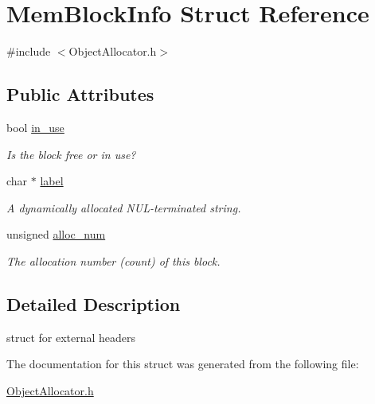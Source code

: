 \hypertarget{structMemBlockInfo}{\section{Mem\-Block\-Info Struct Reference}
\label{structMemBlockInfo}
}


{\ttfamily \#include $<$Object\-Allocator.\-h$>$}

\subsection*{Public Attributes}
\begin{DoxyCompactItemize}
\item 
\hypertarget{structMemBlockInfo_a6a2898598d9e106c34df94961bb08fc8}{bool \hyperlink{structMemBlockInfo_a6a2898598d9e106c34df94961bb08fc8}{in\-\_\-use}}\label{structMemBlockInfo_a6a2898598d9e106c34df94961bb08fc8}

\begin{DoxyCompactList}\small\item\em Is the block free or in use? \end{DoxyCompactList}\item 
\hypertarget{structMemBlockInfo_ac92dcd55e4d9f19752f883174354f7d4}{char $\ast$ \hyperlink{structMemBlockInfo_ac92dcd55e4d9f19752f883174354f7d4}{label}}\label{structMemBlockInfo_ac92dcd55e4d9f19752f883174354f7d4}

\begin{DoxyCompactList}\small\item\em A dynamically allocated N\-U\-L-\/terminated string. \end{DoxyCompactList}\item 
\hypertarget{structMemBlockInfo_abf028a52d7595ad36098b3cc8da0c687}{unsigned \hyperlink{structMemBlockInfo_abf028a52d7595ad36098b3cc8da0c687}{alloc\-\_\-num}}\label{structMemBlockInfo_abf028a52d7595ad36098b3cc8da0c687}

\begin{DoxyCompactList}\small\item\em The allocation number (count) of this block. \end{DoxyCompactList}\end{DoxyCompactItemize}


\subsection{Detailed Description}
struct for external headers 

The documentation for this struct was generated from the following file\-:\begin{DoxyCompactItemize}
\item 
\hyperlink{ObjectAllocator_8h}{Object\-Allocator.\-h}\end{DoxyCompactItemize}
